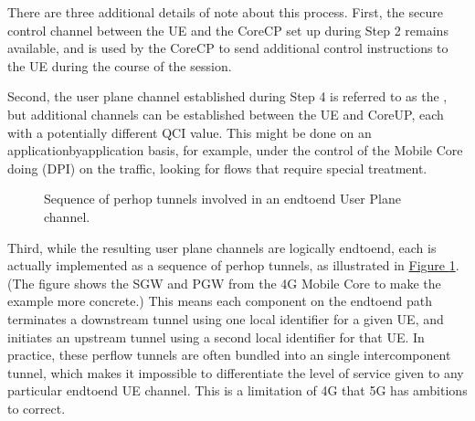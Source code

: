 \documentclass[a4paper,11pt,english]{sphinxmanual}
\let\sphinxpxdimen\pdfpxdimen\else\newdimen\sphinxpxdimen
\begin{document}
\sphinxAtStartPar
There are three additional details of note about this process. First,
the secure control channel between the UE and the Core\sphinxhyphen{}CP set up
during Step 2 remains available, and is used by the Core\sphinxhyphen{}CP to send
additional control instructions to the UE during the course of the
session.

\sphinxAtStartPar
Second, the user plane channel established during Step 4 is referred
to as the , but additional channels can be
established between the UE and Core\sphinxhyphen{}UP, each with a potentially
different QCI value. This might be done on an
application\sphinxhyphen{}by\sphinxhyphen{}application basis, for example, under the control of
the Mobile Core doing  (DPI) on the traffic,
looking for flows that require special treatment.

\begin{figure}[ht]
\centering
\capstart

\noindent\sphinxincludegraphics[width=600\sphinxpxdimen]{{Slide35}.png}
\caption{Sequence of per\sphinxhyphen{}hop tunnels involved in an end\sphinxhyphen{}to\sphinxhyphen{}end User Plane
channel.}\label{\detokenize{arch:id13}}\label{\detokenize{arch:fig-per-hop}}\end{figure}

\sphinxAtStartPar
Third, while the resulting user plane channels are logically
end\sphinxhyphen{}to\sphinxhyphen{}end, each is actually implemented as a sequence of per\sphinxhyphen{}hop
tunnels, as illustrated in \hyperref[\detokenize{arch:fig-per-hop}]{Figure \ref{\detokenize{arch:fig-per-hop}}}.  (The
figure shows the SGW and PGW from the 4G Mobile Core to make the
example more concrete.) This means each component on the end\sphinxhyphen{}to\sphinxhyphen{}end
path terminates a downstream tunnel using one local identifier for a
given UE, and initiates an upstream tunnel using a second local
identifier for that UE. In practice, these per\sphinxhyphen{}flow tunnels are often
bundled into an single inter\sphinxhyphen{}component tunnel, which makes it
impossible to differentiate the level of service given to any
particular end\sphinxhyphen{}to\sphinxhyphen{}end UE channel. This is a limitation of 4G that 5G
has ambitions to correct.
\end{document}
